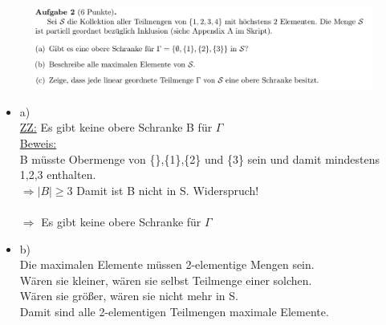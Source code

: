 \documentclass[a4paper]{scrartcl}
\begin{document}
\section*{}%
\label{sec:aufgabe_2}

    \begin{figure}[H]
        \centering
        \includegraphics[scale=0.3]{./A-2.png}
        \label{fig:}
    \end{figure}

    \begin{itemize}
        \item a)\\
            \underline{ZZ:} Es gibt keine obere Schranke B für $\Gamma$\\
            \underline{Beweis:}\\
                B müsste Obermenge von \{\},\{1\},\{2\} und \{3\} sein und damit mindestens 1,2,3 enthalten.\\
                $\Rightarrow |B| \geq 3$ Damit ist B nicht in S. Widerspruch!\\
                \\$\Rightarrow$ Es gibt keine obere Schranke für $\Gamma$\\

        \item b)\\
            Die maximalen Elemente müssen 2-elementige Mengen sein.\\
            Wären sie kleiner, wären sie selbst Teilmenge einer solchen.\\
            Wären sie größer, wären sie nicht mehr in S.\\
            Damit sind alle 2-elementigen Teilmengen maximale Elemente.\\

\newpage


\end{itemize}
\end{document}
